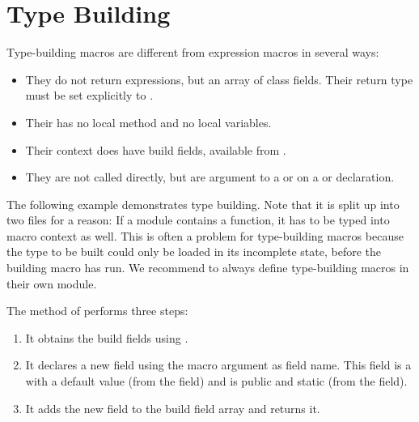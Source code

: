 \documentclass{haxe}
\begin{document}
\section{Type Building}
\label{macro-type-building}

Type-building macros are different from expression macros in several ways:

\begin{itemize}
	\item They do not return expressions, but an array of class fields. Their return type must be set explicitly to .
	\item Their  has no local method and no local variables.
	\item Their context does have build fields, available from .
	\item They are not called directly, but are argument to a  or   on a  or  declaration.
\end{itemize}

The following example demonstrates type building. Note that it is split up into two files for a reason: If a module contains a  function, it has to be typed into macro context as well. This is often a problem for type-building macros because the type to be built could only be loaded in its incomplete state, before the building macro has run. We recommend to always define type-building macros in their own module.


The  method of  performs three steps:

\begin{enumerate}
	\item It obtains the build fields using .
	\item It declares a new  field using the  macro argument as field name. This field is a   with a default value  (from the  field) and is public and static (from the  field).
	\item It adds the new field to the build field array and returns it.
\end{enumerate}
\end{document}
